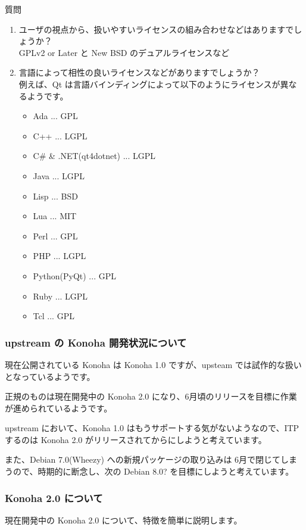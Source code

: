 \documentclass[mingoth,a4paper]{jsarticle}
\begin{document}
\begin{itembox}[l]{質問}
  \begin{enumerate}
  \item ユーザの視点から、扱いやすいライセンスの組み合わせなどはありますでしょうか？\\
    GPLv2 or Later と New BSD のデュアルライセンスなど
  \item 言語によって相性の良いライセンスなどがありますでしょうか？\\
    例えば、Qt は言語バインディングによって以下のようにライセンスが異なるようです。
    \begin{itemize}
    \item Ada ... GPL
    \item C++ ... LGPL
    \item C\# \& .NET(qt4dotnet) ... LGPL
    \item Java ... LGPL
    \item Lisp ... BSD
    \item Lua ... MIT
    \item Perl ... GPL
    \item PHP ... LGPL
    \item Python(PyQt) ... GPL
    \item Ruby ... LGPL
    \item Tcl ... GPL
    \end{itemize}
  \end{enumerate}
\end{itembox}

\subsubsection{upstream の Konoha 開発状況について}
現在公開されている Konoha は Konoha 1.0 ですが、upsteam では試作的な扱いとなっているようです。

正規のものは現在開発中の Konoha 2.0 になり、6月頃のリリースを目標に作業が進められているようです。

upstream において、Konoha 1.0 はもうサポートする気がないようなので、ITP するのは Konoha 2.0 がリリースされてからにしようと考えています。

また、Debian 7.0(Wheezy) への新規パッケージの取り込みは 6月で閉じてしまうので、時期的に断念し、次の Debian 8.0? を目標にしようと考えています。

\subsubsection{Konoha 2.0 について}
現在開発中の Konoha 2.0 について、特徴を簡単に説明します。
\end{document}
